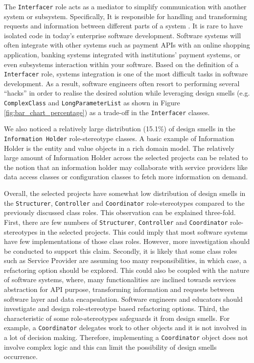 \documentclass[AMA,Times1COL]{WileyNJDv5} %
\begin{document}
	The {\tt Interfacer} role acts as a mediator to simplify communication with another system or subsystem. Specifically, It is responsible for handling and transforming requests and information between different parts of a system \cite{wirfs2006characterizing}. It is rare to have isolated code in today's enterprise software development. Software systems will often integrate with other systems such as payment APIs with an online shopping application, banking systems integrated with institutions' payment systems, or even subsystems interaction within your software. Based on the definition of a {\tt Interfacer} role, systems integration is one of the most difficult tasks in software development. As a result, software engineers often resort to performing several ``hacks'' in order to realise the desired solution while leveraging design smells (e.g. {\tt ComplexClass} and {\tt LongParameterList} as shown in Figure \ref{fig:bar_chart_percentage}) as a trade-off in the {\tt Interfacer} classes.
	
	We also noticed a relatively large distribution (15.1\%) of design smells in the {\tt Information Holder} role-stereotype classes. A basic example of Information Holder is the entity and value objects in a rich domain model. The relatively large amount of Information Holder across the selected projects can be related to the notion that an information holder may collaborate with service providers like data access classes or configuration classes to fetch more information on demand. 
	
	Overall, the selected projects have somewhat low distribution of design smells in the {\tt Structurer}, {\tt Controller} and {\tt Coordinator} role-stereotypes compared to the previously discussed class roles. This observation can be explained three-fold.
	First, there are few numbers of {\tt Structurer}, {\tt Controller} and {\tt Coordinator} role-stereotypes in the selected projects. This could imply that most software systems have few implementations of those class roles. However, more investigation should be conducted to support this claim. Secondly, it is likely that some class roles such as Service Provider are assuming too many responsibilities, in which case, a refactoring option should be explored. This could also be coupled with the nature of software systems, where, many functionalities are inclined towards services abstraction for API purpose,  transforming information and requests between software layer and data encapsulation. Software engineers and educators should investigate and design role-stereotype based refactoring options. Third, the characteristic of some role-stereotypes safeguards it from design smells. For example, a {\tt Coordinator} delegates work to other objects and it is not involved in a lot of decision making. Therefore, implementing a {\tt Coordinator} object does not involve complex logic and this can limit the possibility of design smells occurrence.
	
\end{document}

